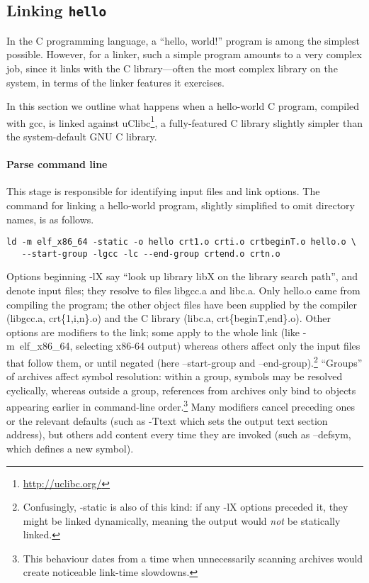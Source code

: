 \subsection{Linking \texttt{hello}}
\label{sec:hello}

In the C programming language, a ``hello, world!'' program is among the simplest possible.
However, for a linker, such a simple program amounts to a very complex job,
since it links with the C library---often the most complex library on the system,
in terms of the linker features it exercises.

In this section we outline what happens when a hello-world C program, compiled with \textsf{gcc},
is linked against uClibc\footnote{\url{http://uclibc.org/}}, 
a fully-featured C library slightly simpler than the system-default GNU C library.

\paragraph{Parse command line}
This stage is responsible for identifying input files and link options.
The command for linking a hello-world program, slightly simplified to omit directory names, 
is as follows.

\begin{lstlisting}[language=plain,basicstyle=\footnotesize\sffamily]
ld -m elf_x86_64 -static -o hello crt1.o crti.o crtbeginT.o hello.o \
   --start-group -lgcc -lc --end-group crtend.o crtn.o 
\end{lstlisting}

Options beginning \textsf{-lX} say ``look up library \textsf{libX} on the library search path'', 
and denote input files; they resolve to files \textsf{libgcc.a} and \textsf{libc.a}.
Only \textsf{hello.o} came from compiling the program;
the other object files have been supplied by the compiler (\textsf{libgcc.a}, \textsf{crt\{1,i,n\}.o})
and the C library (\textsf{libc.a}, \textsf{crt\{beginT,end\}.o}).
Other options are modifiers to the link; some apply to the whole link 
(like \textsf{-m~elf\_x86\_64}, selecting x86-64 output)
whereas others affect only the input files that follow them, or until negated 
(here \textsf{--start-group} and \textsf{--end-group}).\footnote{Confusingly, \textsf{-static} is 
also of this kind: if any \textsf{-lX} options preceded it, they might be linked dynamically, meaning the output
would \emph{not} be statically linked.}
``Groups'' of archives affect symbol resolution: within a group,
symbols may be resolved cyclically, whereas outside a group, 
references from archives only bind to objects appearing earlier in command-line order.\footnote{This
behaviour dates from a time when unnecessarily scanning archives would create
noticeable link-time slowdowns.}
Many modifiers cancel preceding ones or the relevant defaults 
(such as \textsf{-Ttext} which sets the output text section address), 
but others add content every time they are invoked
(such as \textsf{--defsym}, which defines a new symbol).

